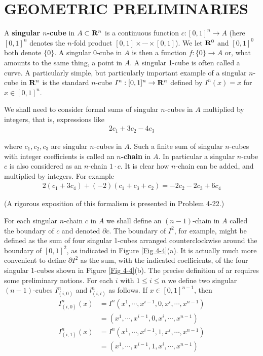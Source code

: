 \clearpage
\section{GEOMETRIC PRELIMINARIES}
A \textbf{singular $n$-cube} in $A\subset \mathbf{R}^n$ is a continuous function 
$c:[0,1]^n\to A$ (here $[0,1]^n$ denotes the $n$-fold product $[0, 1]\times\cdots\times[0,1]$).
We let $\mathbf{R}^0$ and $[0,1]^0$ both denote $\{0\}$. A singular
0-cube in $A$ is then a function $f:\{0\}\to A$ or, what amounts to
the same thing, a point in $A$. A singular 1-cube is often
called a curve. A particularly simple, but particularly
important example of a singular $n$-cube in $\mathbf{R}^n$ is the standard
$n$-cube $I^n:[0,1]^n\to\mathbf{R}^n$ defined by $I^n(x) = x$ for $x\in[0,1]^n$.

We shall need to consider formal sums of singular $n$-cubes in
$A$ multiplied by integers, that is, expressions like
\begin{align*}
    2c_1 + 3c_2 - 4c_3
\end{align*}

where $c_1,c_2,c_3$ are singular $n$-cubes in $A$. Such a finite sum of singular 
$n$-cubes with integer coefficients is called an \textbf{$n$-chain} in $A$. In particular 
a singular $n$-cube $c$ is also considered as an $n$-chain $1\cdot c$. It is clear how 
$n$-chain can be added, and multiplied by integers. For example 
\begin{align*}
    2(c_1+3c_4) + (-2)(c_1+c_3+c_2) = - 2c_2 - 2c_3 + 6c_4
\end{align*}

(A rigorous exposition of this formalism is presented in Problem 4-22.)

For each singular $n$-chain $c$ in $A$ we shall define an $(n-1)$-chain in $A$ called the boundary 
of $c$ and denoted $\partial c$. The boundary of $I^2$, for example, might be defined as the sum of
four singular 1-cubes arranged counterclockwise around the boundary of $[0,1]^2$, as indicated in 
Figure \ref{Fig 4-4}(a). It is actually much more convenient to define $\partial I^2$ as the sum, with
the indicated coefficients, of the four singular 1-cubes shown in Figure \ref{Fig 4-4}(b). The precise 
definition of ar requires some preliminary notions. For each $i$ with $1 \le i\le n$ we define
two singular $(n-1)$-cubes $I^n_{(i,0)}$ and $l^n_{(i,l)}$ as follows. If $x\in[0,1]^{n-1}$, then 
\begin{align*}
    I^n_{(i,0)}(x) 
    & = I^n(x^1,\cdots,x^{i-1},0,x^i,\cdots,x^{n-1}) \\
    & = (x^1,\cdots,x^{i-1},0,x^i,\cdots,x^{n-1})\\
    I^n_{(i,1)}(x)
    & = I^n(x^1,\cdots,x^{i-1},1,x^i,\cdots,x^{n-1}) \\
    & = (x^1,\cdots,x^{i-1},1,x^i,\cdots,x^{n-1})
\end{align*}

